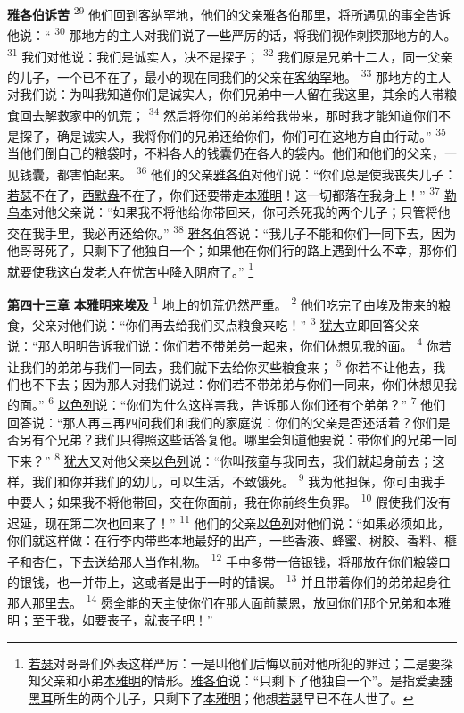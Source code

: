 \textbf{雅各伯诉苦 }
\textsuperscript{29}
他们回到\uline{客纳罕}地，他们的父亲\uline{雅各伯}那里，将所遇见的事全告诉他说：“
\textsuperscript{30}
那地方的主人对我们说了一些严厉的话，将我们视作刺探那地方的人。
\textsuperscript{31}
我们对他说：我们是诚实人，决不是探子；
\textsuperscript{32}
我们原是兄弟十二人，同一父亲的儿子，一个已不在了，最小的现在同我们的父亲在\uline{客纳罕}地。
\textsuperscript{33}
那地方的主人对我们说：为叫我知道你们是诚实人，你们兄弟中一人留在我这里，其余的人带粮食回去解救家中的饥荒；
\textsuperscript{34}
然后将你们的弟弟给我带来，那时我才能知道你们不是探子，确是诚实人，我将你们的兄弟还给你们，你们可在这地方自由行动。”
\textsuperscript{35}
当他们倒自己的粮袋时，不料各人的钱囊仍在各人的袋内。他们和他们的父亲，一见钱囊，都害怕起来。
\textsuperscript{36}
他们的父亲\uline{雅各伯}对他们说：“你们总是使我丧失儿子：\uline{若瑟}不在了，\uline{西默盎}不在了，你们还要带走\uline{本雅明}！这一切都落在我身上！”
\textsuperscript{37}
\uline{勒乌本}对他父亲说：“如果我不将他给你带回来，你可杀死我的两个儿子；只管将他交在我手里，我必再还给你。”
\textsuperscript{38}
\uline{雅各伯}答说：“我儿子不能和你们一同下去，因为他哥哥死了，只剩下了他独自一个；如果他在你们行的路上遇到什么不幸，那你们就要使我这白发老人在忧苦中降入阴府了。”
\footnote{\uline{若瑟}对哥哥们外表这样严厉：一是叫他们后悔以前对他所犯的罪过；二是要探知父亲和小弟\uline{本雅明}的情形。\uline{雅各伯}说：“只剩下了他独自一个”。是指爱妻\uline{辣黑耳}所生的两个儿子，只剩下了\uline{本雅明}；他想\uline{若瑟}早已不在人世了。}

\textbf{第四十三章 }
\textbf{本雅明来埃及 }
\textsuperscript{1}
地上的饥荒仍然严重。
\textsuperscript{2}
他们吃完了由\uline{埃及}带来的粮食，父亲对他们说：“你们再去给我们买点粮食来吃！”
\textsuperscript{3}
\uline{犹大}立即回答父亲说：“那人明明告诉我们说：你们若不带弟弟一起来，你们休想见我的面。
\textsuperscript{4}
你若让我们的弟弟与我们一同去，我们就下去给你买些粮食来；
\textsuperscript{5}
你若不让他去，我们也不下去；因为那人对我们说过：你们若不带弟弟与你们一同来，你们休想见我的面。”
\textsuperscript{6}
\uline{以色列}说：“你们为什么这样害我，告诉那人你们还有个弟弟？”
\textsuperscript{7}
他们回答说：“那人再三再四问我们和我们的家庭说：你们的父亲是否还活着？你们是否另有个兄弟？我们只得照这些话答复他。哪里会知道他要说：带你们的兄弟一同下来？”
\textsuperscript{8}
\uline{犹大}又对他父亲\uline{以色列}说：“你叫孩童与我同去，我们就起身前去；这样，我们和你并我们的幼儿，可以生活，不致饿死。
\textsuperscript{9}
我为他担保，你可由我手中要人；如果我不将他带回，交在你面前，我在你前终生负罪。
\textsuperscript{10}
假使我们没有迟延，现在第二次也回来了！”
\textsuperscript{11}
他们的父亲\uline{以色列}对他们说：“如果必须如此，你们就这样做：在行李内带些本地最好的出产，一些香液、蜂蜜、树胶、香料、榧子和杏仁，下去送给那人当作礼物。
\textsuperscript{12}
手中多带一倍银钱，将那放在你们粮袋口的银钱，也一并带上，这或者是出于一时的错误。
\textsuperscript{13}
并且带着你们的弟弟起身往那人那里去。
\textsuperscript{14}
愿全能的天主使你们在那人面前蒙恩，放回你们那个兄弟和\uline{本雅明}；至于我，如要丧子，就丧子吧！”

